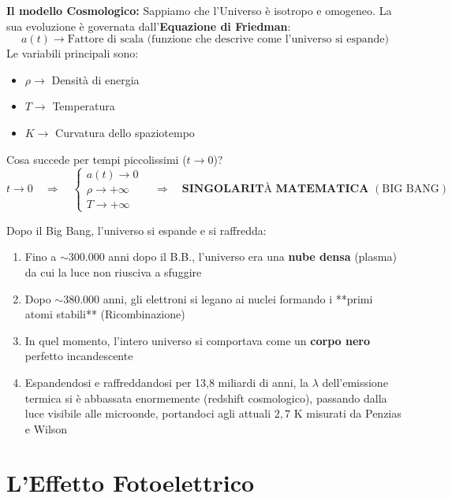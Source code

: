 \documentclass[11pt, a4paper]{article}
\begin{document}
\noindent
\textbf{Il modello Cosmologico:} %
Sappiamo che l'Universo è isotropo e omogeneo. La sua evoluzione è governata dall'\textbf{Equazione di Friedman}: %
\begin{equation*}
    a(t) \rightarrow \text{Fattore di scala (funzione che descrive come l'universo si espande)} %
\end{equation*}
Le variabili principali sono: %
\begin{itemize}
    \item $\rho \rightarrow$ Densità di energia %
    \item $T \rightarrow$ Temperatura %
    \item $K \rightarrow$ Curvatura dello spaziotempo %
\end{itemize}

Cosa succede per tempi piccolissimi ($t \to 0$)? %
\begin{equation*}
    t \to 0 \quad \Rightarrow \quad 
    \begin{cases}
        a(t) \to 0 \\
        \rho \to +\infty \\
        T \to +\infty
    \end{cases} \quad \Rightarrow \quad \textbf{SINGOLARITÀ MATEMATICA } (\text{BIG BANG}) %
\end{equation*}

Dopo il Big Bang, l'universo si espande e si raffredda: %
\begin{enumerate}
    \item Fino a $\sim 300.000$ anni dopo il B.B., l'universo era una \textbf{nube densa} (plasma) da cui la luce non riusciva a sfuggire %
    \item Dopo $\sim 380.000$ anni, gli elettroni si legano ai nuclei formando i **primi atomi stabili** (Ricombinazione) %
    \item In quel momento, l'intero universo si comportava come un \textbf{corpo nero} perfetto incandescente %
    \item Espandendosi e raffreddandosi per 13,8 miliardi di anni, la $\lambda$ dell'emissione termica si è abbassata enormemente (redshift cosmologico), passando dalla luce visibile alle microonde, portandoci agli attuali $2,7 \text{ K}$ misurati da Penzias e Wilson %
\end{enumerate}

\section{L'Effetto Fotoelettrico} %
\end{document}

